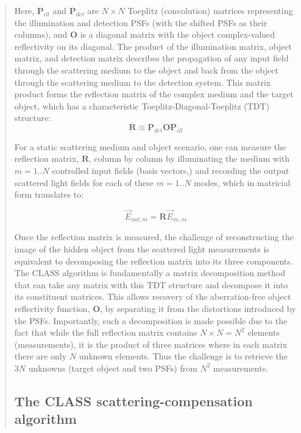 \documentclass[12pt]{article}
\newenvironment{ourresponse}
    {\begin{tcolorbox}[width=\linewidth,breakable,enhanced,colback=gray!5,colframe=responsecolor!50,title=Response,left=5pt,right=5pt]}
    {\end{tcolorbox}}
\begin{document}
\begin{ourresponse}
\begin{quote}
Here, $\mathbf{P}_{ill}$ and $\mathbf{P}_{det}$ are $N \times N$ Toeplitz (convolution) matrices representing the illumination and detection PSFs (with the shifted PSFs as their columns), and $\mathbf{O}$ is a diagonal matrix with the object complex-valued reflectivity on its diagonal. The product of the illumination matrix, object matrix, and detection matrix describes the propagation of any input field through the scattering medium to the object and back from the object through the scattering medium to the detection system. This matrix product forms the reflection matrix of the complex medium and the target object, which has a characteristic Toeplitz-Diagonal-Toeplitz (TDT) structure:
\begin{equation}
    \mathbf{R} \equiv \mathbf{P}_{det} \mathbf{O} \mathbf{P}_{ill}
    \label{eq: ref.matrix definition}
\end{equation}


For a static scattering medium and object scenario, one can measure the reflection matrix, $\textbf{R}$, column by column by illuminating the medium with $m=1..N$ controlled input fields (basis vectors,) and recording the output scattered light fields for each of these $m=1..N$ modes, which in matricial form translates to: 

\begin{equation}
    \vec{E}_{out,m} =  \mathbf{R} \vec{E}_{in,m}
\end{equation}

Once the reflection matrix is measured, the challenge of reconstructing the image of the hidden object from the scattered light measurements is equivalent to decomposing the reflection matrix into its three components. 
The CLASS algorithm \cite{choi2022flexible} is fundamentally a matrix decomposition method that can take any matrix with this TDT structure and decompose it into its constituent matrices. This allows recovery of the aberration-free object reflectivity function, $\mathbf{O}$, by separating it from the distortions introduced by the PSFs. 
Importantly, such a decomposition is made possible due to the fact that while the full reflection matrix contains $N\times N = N^2$ elements (measurements), it is the product of three matrices where in each matrix there are only $N$ unknown elements. Thus the challenge is to retrieve the $3N$ unknowns (target object and two PSFs) from $N^2$ measurements.


\subsection*{The CLASS scattering-compensation algorithm}


\end{quote}
\end{ourresponse}
\end{document}
